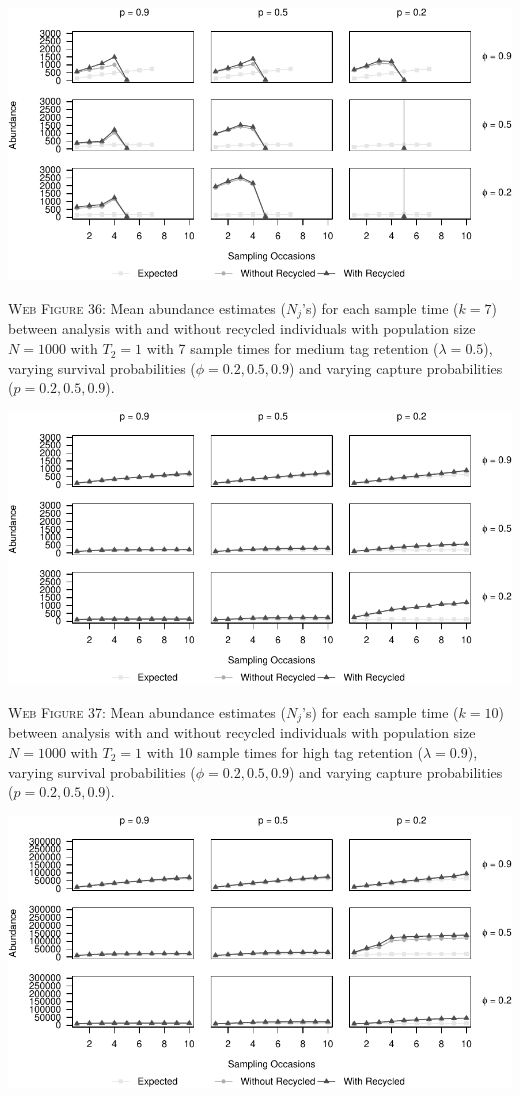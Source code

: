 \documentclass[]{article}
\begin{document}
\includegraphics{Appendix_BW_files/figure-latex/36_abundance_M_GJSTL6-1.pdf}

\textsc{Web Figure 36:} Mean abundance estimates (\(N_j\)'s) for each
sample time (\(k=7\)) between analysis with and without recycled
individuals with population size \(N=1000\) with \(T_2=1\) with 7 sample times for medium tag retention (\(\lambda=0.5\)), varying survival
probabilities (\(\phi=0.2,0.5,0.9\)) and varying capture probabilities
(\(p=0.2,0.5,0.9\)).

\newpage

\includegraphics{Appendix_BW_files/figure-latex/37_abundance_H_GJSTL1-1.pdf}

\textsc{Web Figure 37:} Mean abundance estimates (\(N_j\)'s) for each
sample time (\(k=10\)) between analysis with and without recycled
individuals with population size \(N=1000\) with \(T_2=1\) with 10 sample times for high tag retention (\(\lambda=0.9\)), varying survival
probabilities (\(\phi=0.2,0.5,0.9\)) and varying capture probabilities
(\(p=0.2,0.5,0.9\)).

\includegraphics{Appendix_BW_files/figure-latex/38_abundance_H_GJSTL2-1.pdf}
\end{document}
